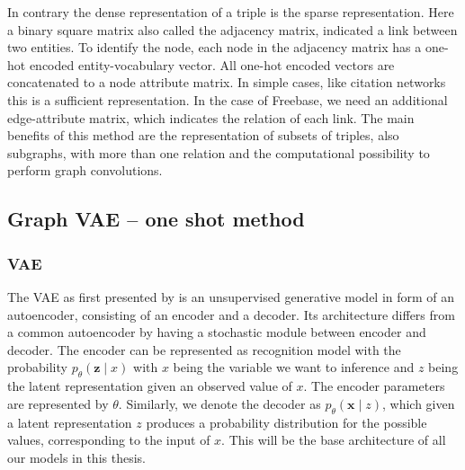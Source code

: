 In contrary the dense representation of a triple is the sparse representation. Here a binary square matrix also called the adjacency matrix, indicated a link between two entities. To identify the node, each node in the adjacency matrix has a one-hot encoded entity-vocabulary vector. All one-hot encoded vectors are concatenated to a node attribute matrix.
In simple cases, like citation networks this is a sufficient representation. In the case of Freebase, we need an additional edge-attribute matrix, which indicates the relation  of each link. The main benefits of this method are the representation of subsets of triples, also subgraphs, with more than one relation and the computational possibility to perform graph convolutions. 



\subsection{Graph VAE – one shot method}

\subsubsection{VAE}
\label{ssection:VAE}



The VAE as first presented by \cite{kingma_auto-encoding_2014} is an unsupervised generative model in form of an autoencoder, consisting of an encoder and a decoder. Its architecture differs from a common autoencoder by having a stochastic module between encoder and decoder. The encoder can be represented as recognition model with the probability $p_{{\theta}}(\mathbf{z} \mid x)$ with $x$ being the variable we want to inference and $z$ being the latent representation given an observed value of $x$. The encoder parameters are represented by $\theta$. Similarly, we denote the decoder as $p_{{\theta}}(\mathbf{x} \mid z)$, which given a latent representation $z$ produces a probability distribution for the possible values, corresponding to the input of $x$. This will be the base architecture of all our models in this thesis.

